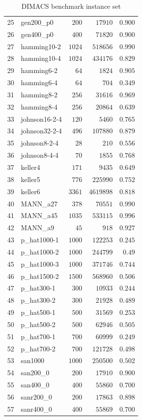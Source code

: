 \documentclass[draft,final]{vutinfth} %
\begin{document}
\begin{table}
{\begin{tabular}{|r|l|r|r|r|}
        25 & gen200\_p0 & $200$ & $17910$ & $0.900$\\
        26 & gen400\_p0 & $400$ & $71820$ & $0.900$\\
        27 & hamming10-2 & $1024$ & $518656$ & $0.990$\\
        28 & hamming10-4 & $1024$ & $434176$ & $0.829$\\
        29 & hamming6-2 & $64$ & $1824$ & $0.905$\\
        30 & hamming6-4 & $64$ & $704$ & $0.349$\\
        31 & hamming8-2 & $256$ & $31616$ & $0.969$\\
        32 & hamming8-4 & $256$ & $20864$ & $0.639$\\
        33 & johnson16-2-4 & $120$ & $5460$ & $0.765$\\
        34 & johnson32-2-4 & $496$ & $107880$ & $0.879$\\
        35 & johnson8-2-4 & $28$ & $210$ & $0.556$\\
        36 & johnson8-4-4 & $70$ & $1855$ & $0.768$\\
        37 & keller4 & $171$ & $9435$ & $0.649$\\
        38 & keller5 & $776$ & $225990$ & $0.752$\\
        39 & keller6 & $3361$ & $4619898$ & $0.818$\\
        40 & MANN\_a27 & $378$ & $70551$ & $0.990$\\
        41 & MANN\_a45 & $1035$ & $533115$ & $0.996$\\
        42 & MANN\_a9 & $45$ & $918$ & $0.927$\\
        43 & p\_hat1000-1 & $1000$ & $122253$ & $0.245$\\
        44 & p\_hat1000-2 & $1000$ & $244799$ & $0.49$\\
        45 & p\_hat1000-3 & $1000$ & $371746$ & $0.744$\\
        46 & p\_hat1500-2 & $1500$ & $568960$ & $0.506$\\
        47 & p\_hat300-1 & $300$ & $10933$ & $0.244$\\
        48 & p\_hat300-2 & $300$ & $21928$ & $0.489$\\
        49 & p\_hat500-1 & $500$ & $31569$ & $0.253$\\
        50 & p\_hat500-2 & $500$ & $62946$ & $0.505$\\
        51 & p\_hat700-1 & $700$ & $60999$ & $0.249$\\
        52 & p\_hat700-2 & $700$ & $121728$ & $0.498$\\
        53 & san1000 & $1000$ & $250500$ & $0.502$\\
        54 & san200\_0 & $200$ & $17910$ & $0.900$\\
        55 & san400\_0 & $400$ & $55860$ & $0.700$\\
        56 & sanr200\_0 & $200$ & $17863$ & $0.898$\\
        57 & sanr400\_0 & $400$ & $55869$ & $0.700$\\ \hline
    \end{tabular}
    }     
    \caption{DIMACS benchmark instance set}   
    \label{tab:DIMACS}
\end{table}
\end{document}

